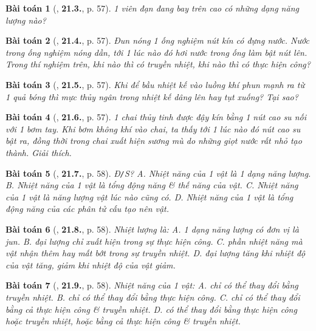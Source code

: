 \documentclass{article}
\numberwithin{equation}{section}
\newtheorem{baitoan}{Bài toán}
\begin{document}
\begin{baitoan}[\cite{SBT_Vat_Ly_8}, \textbf{21.3.}, p. 57]
	1 viên đạn đang bay trên cao có những dạng năng lượng nào?
\end{baitoan}

\begin{baitoan}[\cite{SBT_Vat_Ly_8}, \textbf{21.4.}, p. 57]
	Đun nóng 1 ống nghiệm nút kín có đựng nước. Nước trong ống nghiệm nóng dần, tới 1 lúc nào đó hơi nước trong ống làm bật nút lên. Trong thí nghiệm trên, khi nào thì có truyền nhiệt, khi nào thì có thực hiện công? 
\end{baitoan}

\begin{baitoan}[\cite{SBT_Vat_Ly_8}, \textbf{21.5.}, p. 57]
	Khi để bầu nhiệt kế vào luồng khí phun mạnh ra từ 1 quả bóng thì mực thủy ngân trong nhiệt kế dâng lên hay tụt xuống? Tại sao?
\end{baitoan}

\begin{baitoan}[\cite{SBT_Vat_Ly_8}, \textbf{21.6.}, p. 57]
	1 chai thủy tinh được đậy kín bằng 1 nút cao su nối với 1 bơm tay. Khi bơm không khí vào chai, ta thấy tới 1 lúc nào đó nút cao su bật ra, đồng thời trong chai xuất hiện sương mù do những giọt nước rất nhỏ tạo thành. Giải thích.
\end{baitoan}

\begin{baitoan}[\cite{SBT_Vat_Ly_8}, \textbf{21.7.}, p. 58]
	\emph{Đ\texttt{/}S?} {\sf A.} Nhiệt năng của 1 vật là 1 dạng năng lượng. {\sf B.} Nhiệt năng của 1 vật là tổng động năng \& thế năng của vật. {\sf C.} Nhiệt năng của 1 vật là năng lượng vật lúc nào cũng có. {\sf D.} Nhiệt năng của 1 vật là tổng động năng của các phân tử cấu tạo nên vật.
\end{baitoan}

\begin{baitoan}[\cite{SBT_Vat_Ly_8}, \textbf{21.8.}, p. 58]
	Nhiệt lượng là: {\sf A.} 1 dạng năng lượng có đơn vị là jun. {\sf B.} đại lượng chỉ xuất hiện trong sự thực hiện công. {\sf C.} phần nhiệt năng mà vật nhận thêm hay mất bớt trong sự truyền nhiệt. {\sf D.} đại lượng tăng khi nhiệt độ của vật tăng, giảm khi nhiệt độ của vật giảm.
\end{baitoan}

\begin{baitoan}[\cite{SBT_Vat_Ly_8}, \textbf{21.9.}, p. 58]
	Nhiệt năng của 1 vật: {\sf A.} chỉ có thể thay đổi bằng truyền nhiệt. {\sf B.} chỉ có thể thay đổi bằng thực hiện công. {\sf C.} chỉ có thể thay đổi bằng cả thực hiện công \& truyền nhiệt. {\sf D.} có thể thay đổi bằng thực hiện công hoặc truyền nhiệt, hoặc bằng cả thực hiện công \& truyền nhiệt.
\end{baitoan}
\end{document}
